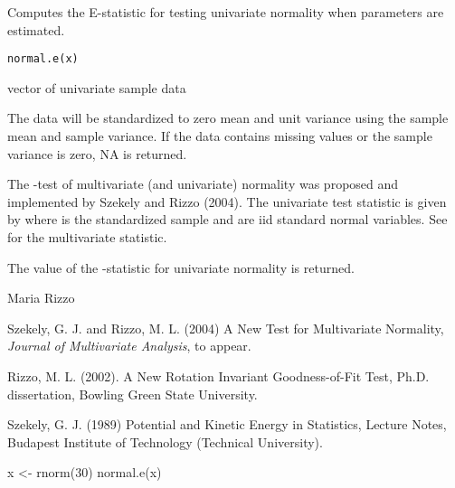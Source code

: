 \begin{Description}\relax
Computes the E-statistic for testing univariate normality 
when parameters are estimated.
\end{Description}
\begin{Usage}
\begin{verbatim}
normal.e(x)
\end{verbatim}
\end{Usage}
\begin{Arguments}
\begin{ldescription}
\item[\code{x}] vector of univariate sample data
\end{ldescription}
\end{Arguments}
\begin{Details}\relax
The
data will be standardized to zero mean and unit variance
using the sample mean and sample variance. If the data contains
missing values or the sample variance is zero, NA is
returned.

The 
-test of multivariate (and univariate)
normality was proposed and implemented by Szekely and Rizzo 
(2004). The univariate test statistic
is given by
where  is the standardized sample and
 are iid standard normal variables. See 
 for the multivariate statistic.\end{Details}
\begin{Value}
The value of the -statistic for univariate
normality is returned.\end{Value}
\begin{Author}\relax
Maria Rizzo 
\end{Author}
\begin{References}\relax
Szekely, G. J. and Rizzo, M. L. (2004) A New Test for 
Multivariate Normality, \emph{Journal of Multivariate Analysis},
to appear.

Rizzo, M. L. (2002). A New Rotation Invariant Goodness-of-Fit Test,
Ph.D. dissertation, Bowling Green State University.

Szekely, G. J. (1989) Potential and Kinetic Energy in Statistics, 
Lecture Notes, Budapest Institute of Technology (Technical University).\end{References}
\begin{SeeAlso}\relax
{}
\end{SeeAlso}
\begin{Examples}
\begin{ExampleCode}
 x <- rnorm(30)
 normal.e(x)
\end{ExampleCode}
\end{Examples}

